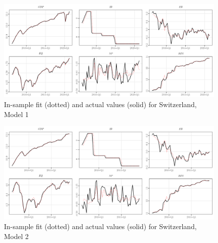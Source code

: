 \documentclass[a4paper, twoside]{templates/ociamthesis}
\begin{document}
\begin{figure}[!ht]

{\centering \includegraphics[width=0.99\columnwidth]{figure/g.model1t.ch} 

}

\caption{In-sample fit (dotted) and actual values (solid) for Switzerland, Model 1}\label{fig:Figure5FITCH1}
\end{figure}

\begin{figure}[!ht]

{\centering \includegraphics[width=0.99\columnwidth]{figure/g.model2t.ch} 

}

\caption{In-sample fit (dotted) and actual values (solid) for Switzerland, Model 2}\label{fig:Figure5FITCH2}
\end{figure}

\clearpage
\end{document}
